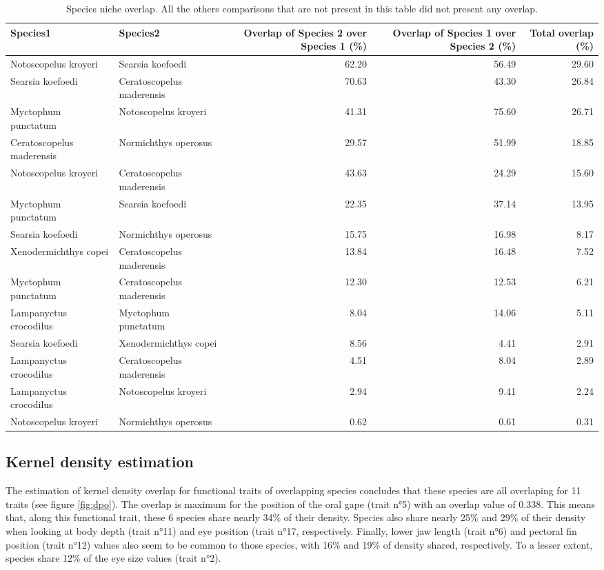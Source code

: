 \begin{table}[ht]
\centering
\caption{Species niche overlap. All the others comparisons that are not present in this table did not present any overlap.}
\label{table:ell_ovlp}
\begin{adjustbox}{max width=1.1\textwidth,center}
\begin{tabular}{llrrr}
  \hline
Species1 & Species2 & Overlap of Species 2 over Species 1 (\%) & Overlap of Species 1 over Species 2 (\%) & Total overlap (\%)\\ 
  \hline
Notoscopelus kroyeri & Searsia koefoedi & 62.20 & 56.49 & 29.60 \\ 
  Searsia koefoedi & Ceratoscopelus maderensis & 70.63 & 43.30 & 26.84 \\ 
  Myctophum punctatum & Notoscopelus kroyeri & 41.31 & 75.60 & 26.71 \\ 
  Ceratoscopelus maderensis & Normichthys operosus & 29.57 & 51.99 & 18.85 \\ 
  Notoscopelus kroyeri & Ceratoscopelus maderensis & 43.63 & 24.29 & 15.60 \\ 
  Myctophum punctatum & Searsia koefoedi & 22.35 & 37.14 & 13.95 \\ 
  Searsia koefoedi & Normichthys operosus & 15.75 & 16.98 & 8.17 \\ 
  Xenodermichthys copei & Ceratoscopelus maderensis & 13.84 & 16.48 & 7.52 \\ 
  Myctophum punctatum & Ceratoscopelus maderensis & 12.30 & 12.53 & 6.21 \\ 
  Lampanyctus crocodilus & Myctophum punctatum & 8.04 & 14.06 & 5.11 \\ 
  Searsia koefoedi & Xenodermichthys copei & 8.56 & 4.41 & 2.91 \\ 
  Lampanyctus crocodilus & Ceratoscopelus maderensis & 4.51 & 8.04 & 2.89 \\ 
  Lampanyctus crocodilus & Notoscopelus kroyeri & 2.94 & 9.41 & 2.24 \\ 
  Notoscopelus kroyeri & Normichthys operosus & 0.62 & 0.61 & 0.31 \\ 
   \hline
\end{tabular}
\end{adjustbox}
\end{table}


\subsection{Kernel density estimation}
The estimation of kernel density overlap for functional traits of overlapping species concludes that these species are all overlaping for 11 traits (see figure \ref{fig:dpo}). The overlap is maximum for the position of the oral gape (trait n°5) with an overlap value of 0.338. This means that, along this functional trait, these 6 species share nearly 34\% of their density. Species also share nearly 25\% and 29\% of their density when looking at body depth (trait n°11) and eye position (trait n°17, respectively. Finally, lower jaw length (trait n°6) and pectoral fin position (trait n°12) values also seem to be common to those species, with 16\% and 19\% of density shared, respectively. To a lesser extent, species share 12\% of the eye size values (trait n°2).


